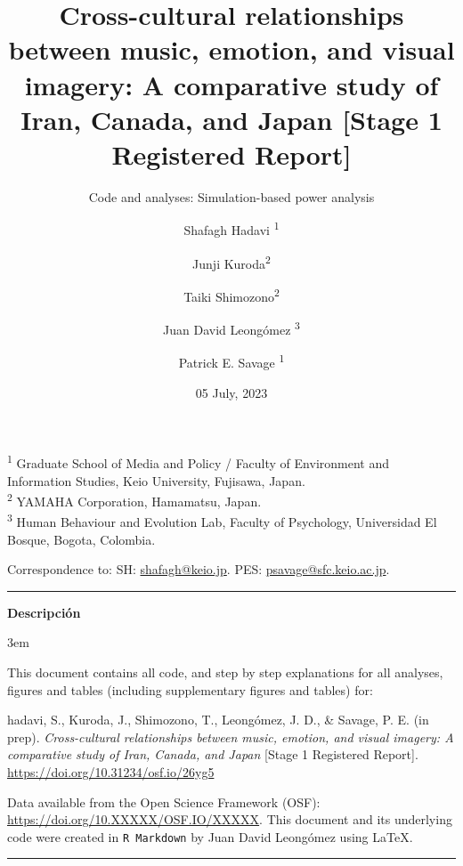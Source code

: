\documentclass[
  bookmarksnumbered]{article}
\title{Cross-cultural relationships between music, emotion, and visual imagery: A comparative study of Iran, Canada, and Japan {[}Stage 1 Registered Report{]}}
\subtitle{Code and analyses: Simulation-based power analysis}
\author{Shafagh Hadavi \orcidlink{0009-0008-1184-7238}\textsuperscript{1} \and Junji Kuroda\textsuperscript{2} \and Taiki Shimozono\textsuperscript{2} \and Juan David Leongómez \orcidlink{0000-0002-0092-6298}\textsuperscript{3} \and Patrick E. Savage \orcidlink{0000-0001-6996-7496}\textsuperscript{1}}
\date{05 July, 2023}
\begin{document}
\maketitle

\textsuperscript{1} Graduate School of Media and Policy / Faculty of Environment and Information Studies, Keio University, Fujisawa, Japan.\\
\textsuperscript{2} YAMAHA Corporation, Hamamatsu, Japan.\\
\textsuperscript{3} Human Behaviour and Evolution Lab, Faculty of Psychology, Universidad El Bosque, Bogota, Colombia.

\begin{center}
Correspondence to:
SH: \href{mailto:shafagh@keio.jp}{shafagh@keio.jp}. 
PES: \href{mailto:psavage@sfc.keio.ac.jp}{psavage@sfc.keio.ac.jp}.

\begin{center}\rule{0.5\linewidth}{0.5pt}\end{center}

\textbf{Descripción}
\end{center}

\par
\begingroup
\leftskip3em
\rightskip\leftskip

This document contains all code, and step by step explanations for all analyses, figures and tables (including supplementary figures and tables) for:

\begin{hangparas}{.25in}{1}
hadavi, S., Kuroda, J., Shimozono, T., Leongómez, J. D., \& Savage, P. E. (in prep). \textit{Cross-cultural relationships between music, emotion, and visual imagery: A comparative study of Iran, Canada, and Japan} [Stage 1 Registered Report]. \url{https://doi.org/10.31234/osf.io/26yg5}
\end{hangparas}

Data available from the Open Science Framework (OSF): \url{https://doi.org/10.XXXXX/OSF.IO/XXXXX}. This document and its underlying code were created in \texttt{R\ Markdown} by Juan David Leongómez using \LaTeX.

\begin{center}\rule{0.5\linewidth}{0.5pt}\end{center}

\par
\endgroup

{\hypersetup{hidelinks}
\setcounter{tocdepth}{6}
\tableofcontents
}
\opensupplement
\end{document}

